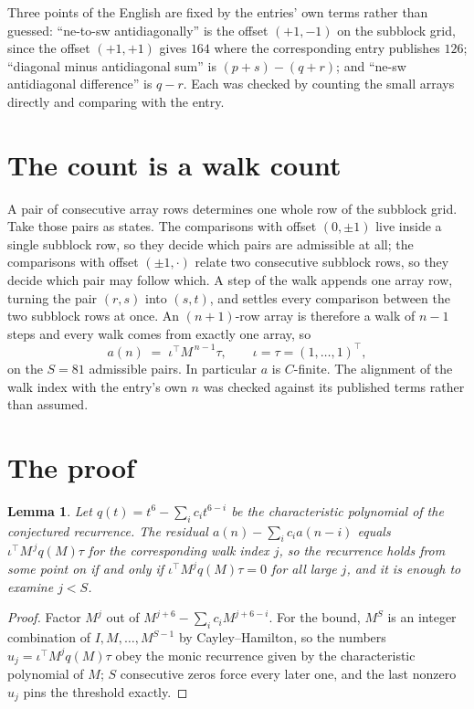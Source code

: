 \documentclass[11pt,a4paper]{article}
\theoremstyle{plain}
\newtheorem{lemma}[theorem]{Lemma}
\theoremstyle{definition}
\begin{document}
Three points of the English are fixed by the entries' own terms rather than guessed:
``ne-to-sw antidiagonally'' is the offset $(+1,-1)$ on the subblock grid, since the offset
$(+1,+1)$ gives $164$ where the corresponding entry publishes $126$; ``diagonal minus
antidiagonal sum'' is $(p+s)-(q+r)$; and ``ne-sw antidiagonal difference'' is $q-r$. Each was
checked by counting the small arrays directly and comparing with the entry.

\section{The count is a walk count}

A pair of consecutive array rows determines one whole row of the subblock grid. Take those
pairs as states. The comparisons with offset $(0,\pm1)$ live inside a single subblock row, so
they decide which pairs are admissible at all; the comparisons with offset $(\pm1,\cdot)$
relate two consecutive subblock rows, so they decide which pair may follow which. A step of the
walk appends one array row, turning the pair $(r,s)$ into $(s,t)$, and settles every comparison
between the two subblock rows at once. An $(n+1)$-row array is therefore a walk of $n-1$ steps
and every walk comes from exactly one array, so
\[
a(n)\;=\;\iota^{\!\top}M^{\,n-1}\tau,\qquad \iota=\tau=(1,\dots,1)^{\!\top},
\]
on the $S=81$ admissible pairs. In particular $a$ is $C$-finite. The alignment of the walk
index with the entry's own $n$ was checked against its published terms rather than assumed.

\section{The proof}

\begin{lemma}\label{lem:crit}
Let $q(t)=t^{6}-\sum_i c_it^{6-i}$ be the characteristic polynomial of the
conjectured recurrence. The residual $a(n)-\sum_ic_ia(n-i)$ equals
$\iota^{\!\top}M^{\,j}q(M)\tau$ for the corresponding walk index $j$, so the recurrence
holds from some point on if and only if $\iota^{\!\top}M^{j}q(M)\tau=0$ for all large $j$,
and it is enough to examine $j<S$.
\end{lemma}

\begin{proof}
Factor $M^{j}$ out of $M^{j+6}-\sum_ic_iM^{j+6-i}$. For the bound, $M^{S}$
is an integer combination of $I,M,\dots,M^{S-1}$ by Cayley--Hamilton, so the numbers
$u_j=\iota^{\!\top}M^{j}q(M)\tau$ obey the monic recurrence given by the characteristic
polynomial of $M$; $S$ consecutive zeros force every later one, and the last nonzero $u_j$
pins the threshold exactly.
\end{proof}
\end{document}

